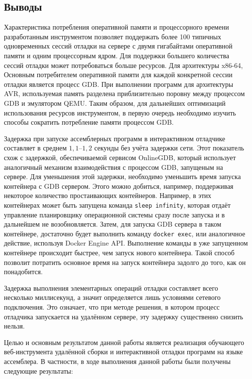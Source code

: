 \documentclass[a4paper,article,14pt]{extarticle}
\begin{document}
\subsection{Выводы}

Характеристика потребления оперативной памяти и процессорного времени разработанным инструментом позволяет поддержать более 100 типичных одновременных сессий отладки на сервере с двумя гигабайтами оперативной памяти и одним процессорным ядром. Для поддержки большего количества сессий отладки может потребоваться больше ресурсов. Для архитектуры x86-64, Основным потребителем оперативной памяти для каждой конкретной сессии отладки является процесс GDB. При выполнении программ для архитектуры AVR, используемая память разделена приблизительно поровну между процессом GDB и эмулятором  QEMU. Таким образом, для дальнейших оптимизаций использования ресурсов инструментом, в первую очередь необходимо изучить способы сократить потребление памяти процессом GDB.

Задержка при запуске ассемблерных программ в интерактивном отладчике составляет в среднем $1{,}1$--$1{,}2$ секунды без учёта задержки сети. Этот показатель схож с задержкой, обеспечиваемой сервисом OnlineGDB\cite{onlinegdb}, который использует аналогичный механизм взаимодействия с процессом GDB, запущеным на сервере. Для уменьшения этой задержки, необходимо уменьшить время запуска контейнера с GDB сервером. Этого можно добиться, например, поддерживая некоторое количество простаивающих контейнеров. Например, в этих контейнерах может быть запущена команда \texttt{sleep infinity}, которая отдаёт управление планировщику операционной системы сразу после запуска и в дальнейшем не возобновляется. Затем, для запуска GDB сервера в таком контейнере, достаточно будет выполнить команду \texttt{docker exec}, или аналогичное действие, используя Docker Engine API. Выполнение команды в уже запущенном контейнере происходит быстрее, чем запуск нового контейнера. Такой способ позволит потратить основное время на запуск контейнера задолго до того, как он понадобится.

Задержка выполнения элементарных операций отладки составляет всего несколько миллисекунд, а значит определяется лишь условиями сетевого подключения. Это означает, что при методе решения, в котором процесс отладчика запускается на удалённом сервере, эту задержку существенно снизить нельзя.

\pagebreak
{}

Целью и основным результатом данной работы является реализация обучающего веб-инструмента удалённой сборки и интерактивной отладки программ на языке ассемблера. В частности, в ходе выполнения данной работы были получены следующие результаты:
\end{document}

